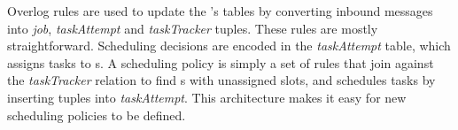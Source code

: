 Overlog rules are used to update the {\JT}'s tables by converting inbound messages
into \emph{job}, \emph{taskAttempt} and \emph{taskTracker} tuples. These rules
are mostly straightforward. Scheduling decisions are encoded in the
\emph{taskAttempt} table, which assigns tasks to {\TT}s. A scheduling policy is
simply a set of rules that join against the \emph{taskTracker} relation to find
\TT{}s with unassigned slots, and schedules tasks by inserting tuples into
\emph{taskAttempt}. This architecture makes it easy for new scheduling policies
to be defined.





